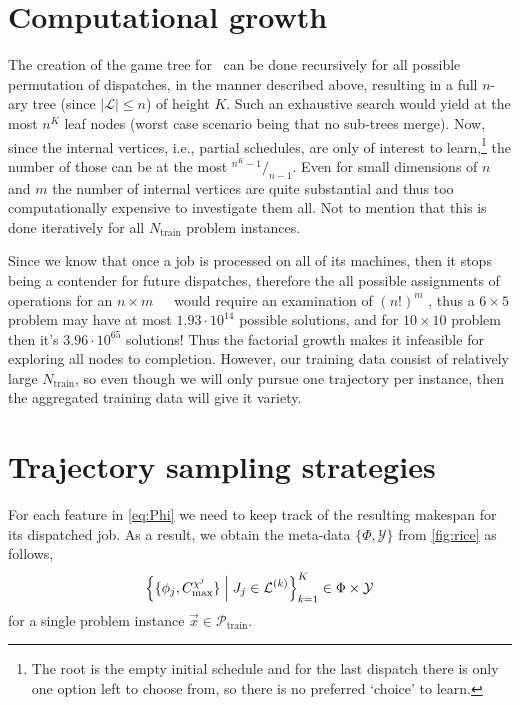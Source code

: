 \section{Computational growth}
The creation of the game tree for \jsp\ can be done recursively for all 
possible permutation of dispatches, in the manner described above, resulting in 
a full \mbox{$n$-ary} tree (since $|\mathcal{L}|\leq n$) of height $K$. Such 
an exhaustive search would yield at the most $n^K$ leaf nodes (worst case 
scenario being that no sub-trees merge). Now, since the internal vertices, 
i.e., partial schedules, are only of interest to learn,\footnote{The root is 
  the empty initial schedule and for the last dispatch there is only one option 
  left to choose from, so there is no preferred `choice' to learn.} 
the number of those can be at the most \mbox{${}^{n^K-1}/_{n-1}$}.
Even for small dimensions of $n$ and $m$ the number of internal vertices are 
quite substantial and thus too computationally expensive to investigate them 
all. Not to mention that this is done iteratively for all $N_{\text{train}}$ 
problem instances.

Since we know that once a job is processed on all of its machines, then it 
stops being a contender for future dispatches, therefore the all possible 
assignments of operations for an $n\times m$~~\JSP\ would require an 
examination of $(n!)^m$ \citep{Giffler60}, thus a $6\times5$ problem may have 
at most $1.93\cdot10^{14}$ possible solutions, and for $10\times10$ problem 
then it's $3.96\cdot10^{65}$ solutions! Thus the factorial growth makes it 
infeasible for exploring all nodes to completion. However, our training data 
consist of relatively large $N_{\text{train}}$, so even though we will only 
pursue one trajectory per instance, then the aggregated training data will give 
it variety.


\section{Trajectory sampling strategies}\label{sec:trdat:tracks}
For each feature in \cref{eq:Phi} we need to keep track of the resulting 
makespan for its dispatched job. 
As a result, we obtain the meta-data $\{\Phi,\mathcal{Y}\}$ from 
\cref{fig:rice} as follows, 
\begin{equation}\label{eq:trdat:metadata}
\condset{\{\vphi_j,C_{\max}^{\vchi^j}\}}{J_j\in\mathcal{L}^{(k)}}_{k=1}^K \in 
\Phi \times \mathcal{Y}
\end{equation}
for a single problem instance $\vec{x}\in\mathcal{P}_{\text{train}}$.

